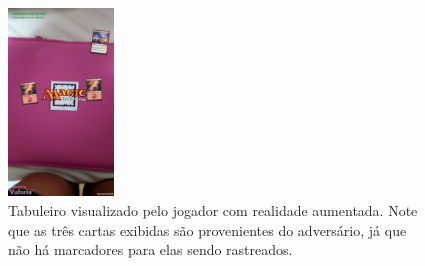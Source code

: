 \documentclass[conference]{IEEEtran}
\begin{document}
\begin{figure}[t]
	\caption{Tabuleiro visualizado pelo jogador com realidade aumentada. Note 
		que as três cartas exibidas são provenientes do adversário, já que não 
		há marcadores para elas sendo rastreados.}
	\label{enemytable}
	\centering
	\includegraphics[width=0.25\textwidth]{enemytable}
\end{figure}



\end{document}
